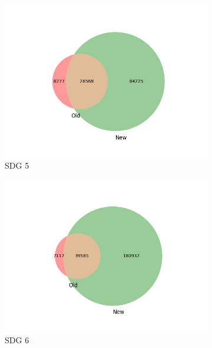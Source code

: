 \documentclass{article}
\begin{document}
\begin{figure}[H]
\begin{subfigure}{0.24\textwidth}
        \includegraphics[width=\textwidth]{figures/aurora-elsevier-venn/venn_sdg_5.jpg}
	    \caption{SDG 5}
    \end{subfigure}
    \hfill
    \begin{subfigure}{0.24\textwidth}
        \centering
        \includegraphics[width=\textwidth]{figures/aurora-elsevier-venn/venn_sdg_6.jpg}
	    \caption{SDG 6}
    \end{subfigure}
    \hfill
    \begin{subfigure}{0.24\textwidth}
        \centering

\end{subfigure}
\end{figure}
\end{document}
